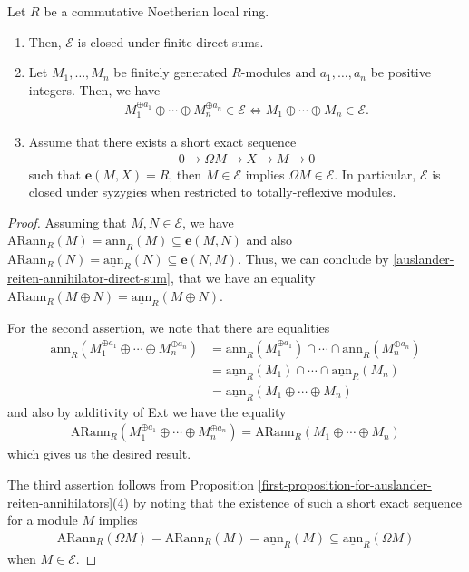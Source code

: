\documentclass[10pt,a4paper]{amsart}
\def\e{\boldsymbol{e}}
\newcommand{\EE}{\mathcal{E}}
\newcommand{\arann}{\mathrm{ARann}}
\newcommand{\sann}{\underline{\mathrm{ann}}}
\begin{document}
    \begin{lemma}\label{main-direct-sum-lemma}
        Let $R$ be a commutative Noetherian local ring.
        \begin{enumerate}
            \item Then, $\EE$ is closed under finite direct sums.
            \item Let $M_1, \ldots, M_n$ be finitely generated $R$-modules and $a_1, \ldots, a_n$ be positive integers. Then, we have 
            \begin{align*}
                M_1^{\oplus a_1} \oplus \cdots \oplus M_n^{\oplus a_n} \in \EE \iff M_1 \oplus \cdots \oplus M_n \in \EE.
            \end{align*}
            \item Assume that there exists a short exact sequence 
            \begin{align*}
            0 \to \Omega M \to X \to M \to 0
            \end{align*}
            such that $\e(M,X) = R$, then $M \in \EE$ implies $\Omega M \in \EE$. In particular, $\EE$ is closed under syzygies when restricted to totally-reflexive modules.
        \end{enumerate}
    \end{lemma}

    \begin{proof}
        Assuming that $M, N \in \EE$, we have $\arann_R(M) = \sann_R(M) \subseteq \e(M,N)$ and also $\arann_R(N) = \sann_R(N) \subseteq \e(N,M)$. Thus, we can conclude by \ref{auslander-reiten-annihilator-direct-sum}, that we have an equality $\arann_R(M \oplus N) = \sann_R(M \oplus N)$. 
        
        For the second assertion, we note that there are equalities
        \begin{align*}
        \sann_R(M_1^{\oplus a_1} \oplus \cdots \oplus M_n^{\oplus a_n}) &= \sann_R(M_1^{\oplus a_1}) \cap \cdots \cap \sann_R(M_n^{\oplus a_n})\\ &= \sann_R(M_1) \cap \cdots \cap \sann_R(M_n) \\
        & = \sann_R(M_1 \oplus \cdots \oplus M_n) 
        \end{align*}
        and also by additivity of Ext we have the equality 
        \begin{align*}
        \arann_R(M_1^{\oplus a_1} \oplus \cdots \oplus M_n^{\oplus a_n}) = \arann_R(M_1 \oplus \cdots \oplus M_n)
        \end{align*}
        which gives us the desired result.
        

        The third assertion follows from Proposition \ref{first-proposition-for-auslander-reiten-annihilators}(4) by noting that the existence of such a short exact sequence for a module $M$ implies
        \begin{align*}
            \arann_R(\Omega M) = \arann_R(M) = \sann_R(M) \subseteq \sann_R(\Omega M)
        \end{align*}
        when $M \in \EE$.
    \end{proof}
\end{document}
